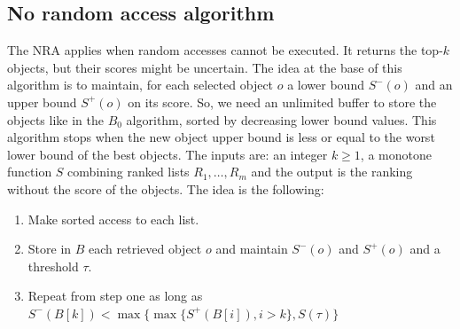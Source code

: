 \documentclass[12pt, a4paper]{report}
\newtheorem[style=M,bodystyle=\normalfont]{theorem}{Theorem}
\newtheorem[style=M,bodystyle=\normalfont]{corollary}{Corollary}
\newtheorem[style=M,bodystyle=\normalfont]{lemma}{Lemma}
\newtheorem[style=M,bodystyle=\normalfont]{definition}{Definition}
\begin{document}
    \subsection{No random access algorithm}
    The NRA applies when random accesses cannot be executed. It returns the top-$k$ objects, but their 
    scores might be uncertain. The idea at the base of this algorithm is to maintain, for each selected object
    $o$ a lower bound $S^{-}(o)$ and an upper bound $S^{+}(o)$ on its score. So, we need an unlimited buffer to 
    store the objects like in the $B_0$ algorithm, sorted by decreasing lower bound values. This algorithm 
    stops when the new object upper bound is less or equal to the worst lower bound of the best objects. The inputs are: 
    an integer $k \geq 1$, a monotone function $S$ combining ranked lists $R_1, \dots, R_m$ and the output is the ranking
    without the score of the objects. The idea is the following: 
    \begin{enumerate}
        \item Make sorted access to each list. 
        \item Store in $B$ each retrieved object $o$ and maintain $S^{-}(o)$ and $S^{+}(o)$ and a threshold $\tau$. 
        \item Repeat from step one as long as $S^{-}(B[k]) < \max\{ \max\{S^{+}(B[i]), i > k\}, S(\tau) \}$
    \end{enumerate}
\end{document}
